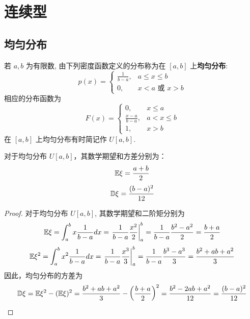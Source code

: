 \section{连续型}\label{sec:连续型}
\subsection{均匀分布}\label{subsec:均匀分布}
\begin{definition}[均匀分布]
    若 $a,b$ 为有限数, 由下列密度函数定义的分布称为在 $[a,b]$ 上\textbf{均匀分布}:
\begin{equation} \label{eq:uniform_pdf}
p(x) = \begin{cases}
\frac{1}{b-a}, & a \le x \le b \\
0, & x < a \text{ 或 } x > b
\end{cases}
\end{equation}
相应的分布函数为
\begin{equation} \label{eq:uniform_cdf}
F(x) = \begin{cases}
0, & x \le a \\
\frac{x-a}{b-a}, & a < x \le b \\
1, & x > b
\end{cases}
\end{equation}
在 $[a,b]$ 上均匀分布有时简记作 $U[a,b]$.
\end{definition}

\begin{proposition} \label{prop:uniform_expectation_variance}
对于均匀分布 $U[a,b]$，其数学期望和方差分别为：
\[
\mathbb{E}\xi = \frac{a+b}{2}
\]
\[
\mathbb{D}\xi = \frac{(b-a)^2}{12}
\]
\end{proposition}

\begin{proof}
对于均匀分布 $U[a,b]$, 其数学期望和二阶矩分别为
\[
\mathbb{E}\xi = \int_a^b x \frac{1}{b-a}dx = \left. \frac{1}{b-a} \frac{x^2}{2} \right|_a^b = \frac{1}{b-a} \frac{b^2-a^2}{2}  = \frac{b+a}{2}
\]
\[
\mathbb{E}\xi^2 = \int_a^b x^2 \frac{1}{b-a}dx = \left. \frac{1}{b-a} \frac{x^3}{3} \right|_a^b = \frac{1}{b-a} \frac{b^3-a^3}{3} = \frac{b^2+ab+a^2}{3}
\]
因此，均匀分布的方差为
\begin{equation} \label{eq:uniform_variance_formula}
\mathbb{D}\xi = \mathbb{E}\xi^2 - (\mathbb{E}\xi)^2 = \frac{b^2+ab+a^2}{3} - \left(\frac{b+a}{2}\right)^2 = \frac{b^2-2ab+a^2}{12} = \frac{(b-a)^2}{12}
\end{equation}
\end{proof}
